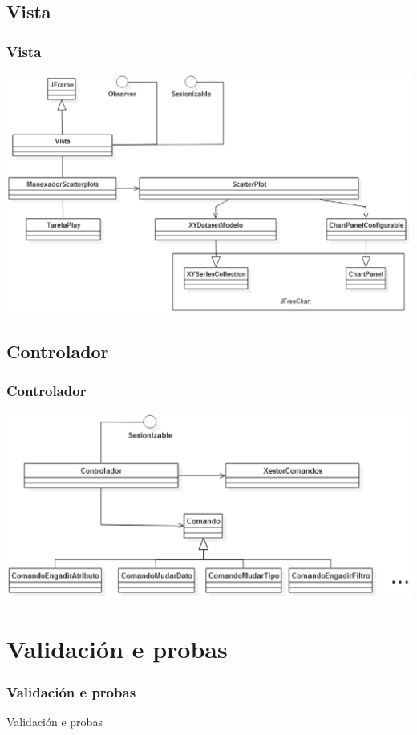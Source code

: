 \documentclass{beamer}
\begin{document}
\subsection{Vista}
\begin{frame}
\frametitle{Vista} 
\includegraphics[width=\textwidth,height=\textheight,keepaspectratio]{figuras/vistaPresentacion}
\end{frame}
\subsection{Controlador}
\begin{frame}
\frametitle{Controlador} 
\includegraphics[width=\textwidth,height=\textheight,keepaspectratio]{figuras/controladorPresentacion}
\end{frame}


\section{Validación e probas} 

\begin{frame}
\frametitle{Validación e probas} 
Validación e probas
\end{frame}
\end{document}
